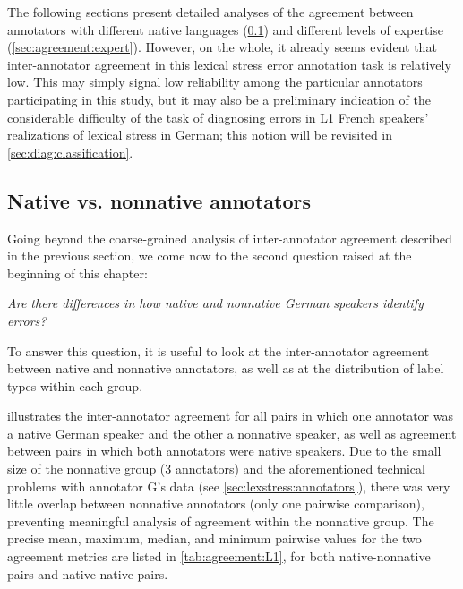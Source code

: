 			The following sections present detailed analyses of the agreement between annotators with different native languages (\cref{sec:agreement:native}) and different levels of expertise (\cref{sec:agreement:expert}).  However, on the whole, it already seems evident that inter-annotator agreement in this lexical stress error annotation task is relatively low. This may simply signal low reliability among the particular annotators participating in this study, but it may also be a preliminary indication of the considerable difficulty of the task of diagnosing errors in L1 French speakers' realizations of lexical stress in German; this notion will be revisited in \cref{sec:diag:classification}. 

	
	
		\subsection{Native vs. nonnative annotators}
		\label{sec:agreement:native}

		
		
		Going beyond the coarse-grained analysis of inter-annotator agreement described in the previous section, we come now to the second question raised at the beginning of this chapter:
		
		\textit{Are there differences in how native and nonnative German speakers identify errors?}
		
		
		To answer this question, it is useful to look at the inter-annotator agreement between native and nonnative annotators, as well as at the distribution of label types within each group. 
		
		 illustrates the inter-annotator agreement for all pairs in which one annotator was a native German speaker and the other a nonnative speaker, as well as agreement between pairs in which both annotators were native speakers. Due to the small size of the nonnative group (3 annotators) and the aforementioned technical problems with annotator G's data (see \cref{sec:lexstress:annotators}), there was very little overlap between nonnative annotators (only one pairwise comparison), preventing meaningful analysis of agreement within the nonnative group. The precise mean, maximum, median, and minimum pairwise values for the two agreement metrics are listed in \cref{tab:agreement:L1}, for both  native-nonnative pairs and native-native pairs. 
		
